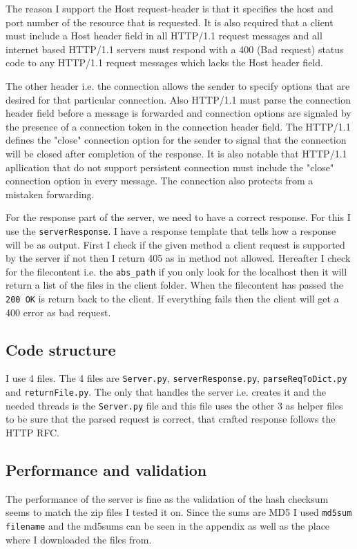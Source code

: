 \documentclass{sig-alternate-05-2015}
\begin{document}
The reason I support the Host request-header is that it specifies the host and port number of the resource that is requested. It is also required that a client must include a Host header field in all HTTP/1.1 request messages and all internet based HTTP/1.1 servers must respond with a 400 (Bad request) status code to any HTTP/1.1 request messages which lacks the Host header field.

The other header i.e. the connection allows the sender to specify options that are desired for that particular connection. Also HTTP/1.1 must parse the connection header field before a message is forwarded and connection options are signaled by the presence of a connection token in the connection header field. The HTTP/1.1 defines the "close" connection option for the sender to signal that the connection will be closed after completion of the response. It is also notable that HTTP/1.1 apllication that do not support persistent connection must include the "close" connection option in every message. The connection also protects from a mistaken forwarding.

For the response part of the server, we need to have a correct response. For this I use the \texttt{serverResponse}. I have a response template that tells how a response will be as output. First I check if the given method a client request is supported by the server if not then I return 405 as in method not allowed. Hereafter I check for the filecontent i.e. the \texttt{abs\_path} if you only look for the localhost then it will return a list of the files in the client folder. When the filecontent has passed the \texttt{200 OK} is return back to the client. If everything fails then the client will get a 400 error as bad request.


\subsection{Code structure}
I use 4 files. The 4 files are \texttt{Server.py}, \texttt{serverResponse.py}, \texttt{parseReqToDict.py} and \texttt{returnFile.py}. The only that handles the server i.e. creates it and the needed threads is the \texttt{Server.py} file and this file uses the other 3 as helper files to be sure that the parsed request is correct, that crafted response follows the HTTP RFC.

\subsection{Performance and validation}
The performance of the server is fine as the validation of the hash checksum seems to match the zip files I tested it on. Since the sums are MD5 I used \texttt{md5sum filename} and the md5sums can be seen in the appendix as well as the place where I downloaded the files from.
\end{document}
